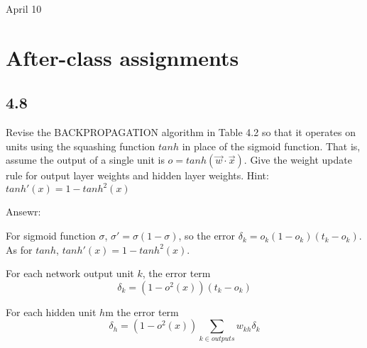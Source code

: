 \univlogo

{\Huge April 10}\vspace{5mm}

\section*{After-class assignments}

\subsection*{4.8}

Revise the BACKPROPAGATION algorithm in Table 4.2 so that it operates on units using the squashing function $tanh$ in place of the sigmoid function. That is, assume the output of a single unit is $o=tanh(\vec{w}\cdot\vec{x})$. Give the weight update rule for output layer weights and hidden layer weights. Hint: $tanh'(x)=1-tanh^2(x)$

Ansewr:

For sigmoid function $\sigma$, $\sigma'=\sigma(1-\sigma)$, so the error $\delta_k=o_k(1-o_k)(t_k-o_k)$. As for $tanh$, $tanh'(x)=1-tanh^2(x)$.

For each network output unit $k$, the error term
\begin{equation}
    \delta_k=(1-o^2(x))(t_k-o_k)    \nonumber
\end{equation}

For each hidden unit $h$m the error term 
\begin{equation}
    \delta_h=(1-o^2(x))\sum_{k\in outputs}w_{kh}\delta_k    \nonumber
\end{equation}


